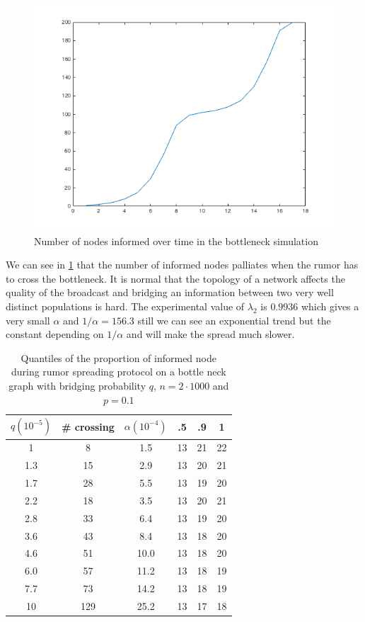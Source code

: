 \documentclass[10pt,journal,a4paper]{IEEEtran}
\begin{document}
\begin{figure}[h]
\centering
\includegraphics[width=1\linewidth]{figs/split-chart}
\caption{Number of nodes informed over time in the bottleneck simulation}
\label{fig:split-chart}
\end{figure}

We can see in \cref{fig:split-chart} that the number of informed nodes palliates when the rumor has to cross the bottleneck. It is normal that the topology of a network affects the quality of the broadcast and bridging an information between two very well distinct populations is hard. The experimental value of $\lambda_2$ is $0.9936$ which gives a very small $\alpha$ and $1/\alpha = 156.3$ still we can see an exponential trend but the constant depending on $1/\alpha$ and will make the spread much slower.

\begin{table}
\centering
\begin{tabular}{c|c|c||c|c|c}
  $q (10^{-5})$ & \# crossing & $\alpha (10^{-4})$ & .5 & .9 & 1\\
  \hline
  1 & 8 & 1.5 & 13 & 21 & 22 \\
1.3 & 15 & 2.9 & 13 & 20 & 21 \\
1.7 & 28 & 5.5 & 13 & 19 & 20 \\
2.2 & 18 & 3.5 & 13 & 20 & 21 \\
2.8 & 33 & 6.4 & 13 & 19 & 20 \\
3.6 & 43 & 8.4 & 13 & 18 & 20 \\
4.6 & 51 & 10.0 & 13 & 18 & 20 \\
6.0 & 57 & 11.2 & 13 & 18 & 19 \\
7.7 & 73 & 14.2 & 13 & 18 & 19 \\
10 & 129 & 25.2 & 13 & 17 & 18 \\
\end{tabular}
\caption{Quantiles of the proportion of informed node during rumor spreading protocol on a bottle neck graph with bridging probability $q$, $n = 2 \cdot 1000$ and $p = 0.1$}
\label{tab:quantiles}
\end{table}
\end{document}
